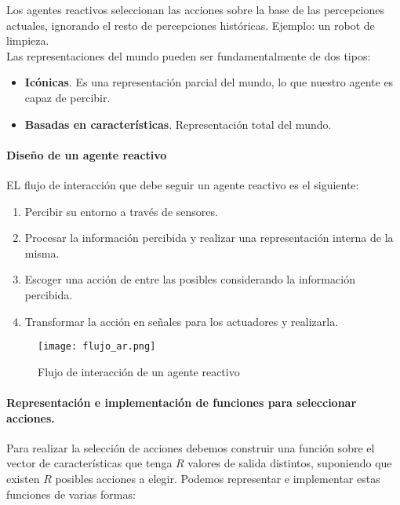 \documentclass[12pt,spanish]{article}
\numberwithin{definition}{subsection}
\begin{document}
Los agentes reactivos seleccionan las acciones sobre la base de las percepciones actuales, ignorando el resto de percepciones históricas. Ejemplo: un robot de limpieza.\\

Las representaciones del mundo pueden ser fundamentalmente de dos tipos:
\begin{itemize}
	\item \textbf{Icónicas}. Es una representación parcial del mundo, lo que nuestro agente es capaz de percibir.
	\item \textbf{Basadas en características}. Representación total del mundo.
\end{itemize}

\paragraph{Diseño de un agente reactivo}

EL flujo de interacción 	que debe seguir un agente reactivo es el siguiente:

\begin{enumerate}
	\item Percibir su entorno a través de sensores.
	\item Procesar la información percibida y realizar una representación interna de la misma.
	\item Escoger una acción de entre las posibles considerando la información percibida.
	\item Transformar la acción en señales para los actuadores y realizarla.
\end{enumerate}

\begin{figure}[H]
\centering
\texttt{[image: flujo\_ar.png]}
\caption{Flujo de interacción de un agente reactivo}
\end{figure}
\newpage

\paragraph{Representación e implementación de funciones para seleccionar acciones.\\}

Para realizar la selección de acciones debemos construir una función sobre el vector de características que tenga $R$ valores de salida distintos, suponiendo que existen $R$ posibles acciones a elegir. Podemos representar e implementar estas funciones de varias formas:
\end{document}
